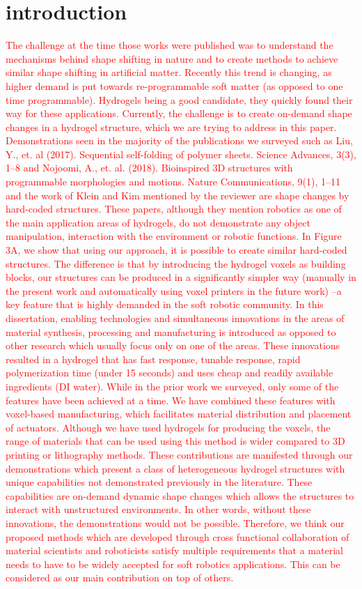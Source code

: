 \graphicspath{{Images/intro/}}
\chapter{introduction}
\label{chap:intro}
\textcolor{red}{The challenge at the time those works were published was to understand the mechanisms behind shape shifting in nature and to create methods to achieve similar shape shifting in artificial matter. Recently this trend is changing, as higher demand is put towards re-programmable soft matter (as opposed to one time programmable). Hydrogels being a good candidate, they quickly found their way for these applications. Currently, the challenge is to create on-demand shape changes in a hydrogel structure, which we are trying to address in this paper. Demonstrations seen in the majority of the publications we surveyed such as {Liu, Y., et. al (2017). Sequential self-folding of polymer sheets. Science Advances, 3(3), 1–8} and {Nojoomi, A., et. al. (2018). Bioinspired 3D structures with programmable morphologies and motions. Nature Communications, 9(1), 1–11} and the work of Klein and Kim mentioned by the reviewer are shape changes by hard-coded structures. These papers, although they mention robotics as one of the main application areas of hydrogels, do not demonstrate any object manipulation, interaction with the environment or robotic functions. In Figure 3A, we show that using our approach, it is possible to create similar hard-coded structures. The difference is that by introducing the hydrogel voxels as building blocks, our structures can be produced in a significantly simpler way (manually in the present work and automatically using voxel printers in the future work) --a key feature that is highly demanded in the soft robotic community. 
In this dissertation, enabling technologies and simultaneous innovations in the areas of material synthesis, processing and manufacturing  is introduced as opposed to other research which usually focus only on one of the areas. These innovations resulted in a hydrogel that has fast response, tunable response, rapid polymerization time (under 15 seconds) and uses cheap and readily available ingredients (DI water). While in the prior work we surveyed, only some of the features have been achieved at a time. We have combined these features with voxel-based manufacturing, which facilitates material distribution and placement of actuators. Although we have used hydrogels for producing the voxels, the range of materials that can be used using this method is wider compared to 3D printing or lithography methods. These contributions are manifested through our demonstrations which present a class of heterogeneous hydrogel structures with unique capabilities not demonstrated previously in the literature. These capabilities are on-demand dynamic shape changes which allows the structures to interact with unstructured environments. In other words, without these innovations, the demonstrations would not be possible. Therefore, we think our proposed methods which are developed through cross functional collaboration of material scientists and roboticists satisfy multiple requirements that a material needs to have to be widely accepted for soft robotics applications. This can be considered as our main contribution on top of others.}

